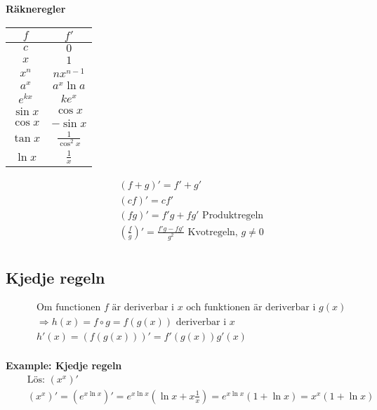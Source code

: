 \textbf{Räkneregler}
\begin{center}
\begin{tabular}{ |c|c| } 
 \hline
 $f$       & $f'$         \\
 \hline
 $c$       & $0$          \\
 $x$       & $1$          \\ 
 $x^n$     & $nx^{n-1}$    \\  
 $a^x$     & $a^x\ln{a}$   \\ 
 $e^{kx}$  & $ke^{x}$       \\
 $\sin{x}$ & $\cos{x}$     \\
 $\cos{x}$ & $-\sin{x}$    \\
 $\tan{x}$ & $\frac{1}{\cos^2{x}}$    \\
 $\ln{x}$  & $\frac{1}{x}$ \\
 \hline
\end{tabular}
\end{center}

\begin{align*}
  &\quad  (f+g)' = f' + g' \\
  &\quad  (cf)'  = cf' \\
  &\quad  (fg)'  = f'g + fg' \text{ Produktregeln} \\
  &\quad  \left( \frac{f}{g} \right)' = \frac{f'g - fg'}{g^2} \text{ Kvotregeln, } g \neq 0 \\
\end{align*}


\subsection{Kjedje regeln}
\begin{align*}
  &\quad  \text{Om functionen $f$ är deriverbar i $x$ och funktionen är deriverbar i } g(x) \\
  &\quad  \Rightarrow h(x)=f \circ g = f(g(x)) \text{ deriverbar i } x \\
  &\quad  h'(x)=(f(g(x)))'=f'(g(x))g'(x) \\ 
\end{align*}

\textbf{Example: Kjedje regeln}
\begin{align*}
  &\quad  \text{Lös: } (x^x)'  \\
  &\quad  (x^x)'=\left( e^{x\ln{x}} \right)'=e^{x\ln{x}} \left( \ln{x}+x\frac{1}{x} \right) = e^{x\ln{x}}(1+\ln{x})=x^x(1+\ln{x}) \\
\end{align*}

